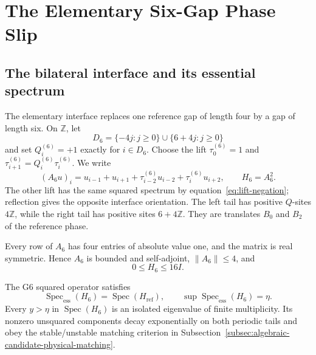 \section{The Elementary Six-Gap Phase Slip}
\label{sec:elementary-g6}

\subsection{The bilateral interface and its essential spectrum}
\label{subsec:bilateral-interface-essential-spectrum}

The elementary interface replaces one reference gap of length four by a gap
of length six.  On \(\mathbb Z\), let
\[
D_6=\{-4j:j\geq0\}\cup\{6+4j:j\geq0\}
\]
and set \(Q_i^{(6)}=+1\) exactly for \(i\in D_6\).  Choose the lift
\(\tau_0^{(6)}=1\) and
\(\tau_{i+1}^{(6)}=Q_i^{(6)}\tau_i^{(6)}\).  We write
\[
(A_6u)_i=u_{i-1}+u_{i+1}
+\tau_{i-2}^{(6)}u_{i-2}+\tau_i^{(6)}u_{i+2},
\qquad H_6=A_6^2.
\]
The other lift has the same squared spectrum by
equation~\eqref{eq:lift-negation}; reflection gives the opposite interface
orientation.  The left tail has positive \(Q\)-sites \(4\mathbb Z\), while
the right tail has positive sites \(6+4\mathbb Z\).  They are translates
\(B_0\) and \(B_2\) of the reference phase.

Every row of \(A_6\) has four entries of absolute value one, and the matrix is
real symmetric.  Hence \(A_6\) is bounded and self-adjoint,
\(\|A_6\|\leq4\), and
\[
0\leq H_6\leq16I.
\]

\begin{lemma}
\label{lem:g6-essential}
The G6 squared operator satisfies
\[
\operatorname{Spec}_{\mathrm{ess}}(H_6)
=\operatorname{Spec}(H_{\mathrm{ref}}),
\qquad
\sup\operatorname{Spec}_{\mathrm{ess}}(H_6)=\eta.
\]
Every \(y>\eta\) in \(\operatorname{Spec}(H_6)\) is an isolated eigenvalue
of finite multiplicity.  Its nonzero unsquared components decay
exponentially on both periodic tails and obey the stable/unstable matching
criterion in Subsection~\ref{subsec:algebraic-candidate-physical-matching}.
\end{lemma}

